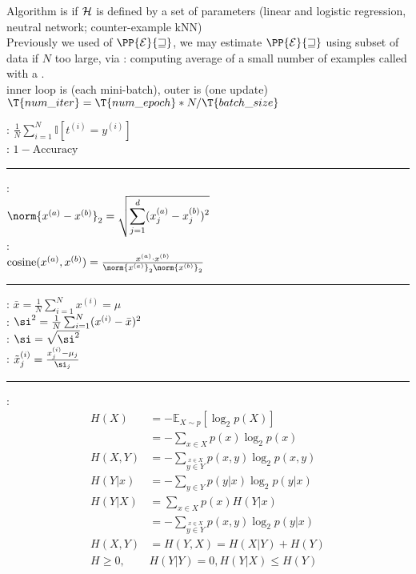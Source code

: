 \documentclass[10pt]{CheatSheet/hw}
\begin{document}
\begin{multicols*}{5}
Algorithm is  if $\cal{H}$ is defined by a set of parameters (linear and logistic regression, neutral network; counter-example kNN)\\
Previously we used  of $\PP{\cal{E}}{w}$, we may estimate $\PP{\cal{E}}{w}$ using subset of data if $N$ too large, via : computing average of a small number of examples called  with a .\\
inner loop is  (each mini-batch), outer is  (one update)\\
$\T{num\_iter}=\T{num\_epoch}* N / \T{batch\_size}$

: $\frac1N\sum_{i=1}^N \mathbb{I}[t^{(i)} = y^{(i)}]$\\
: $1 - \text{Accuracy}$\\
\rule{\linewidth}{0.4pt}
:\\ $\norm{x^{(a)}-x^{(b)}}_2 = \sqrt{\displaystyle\sum_{j=1}^d(x_j^{(a)}-x_j^{(b)})^2}$\\
:\\
$\operatorname{cosine}(x^{(a)}, x^{(b)}) = \frac{x^{(a)}\cdot x^{(b)}}{\norm{x^{(a)}}_2\norm{x^{(b)}}_2}$\\
\rule{\linewidth}{0.4pt}
: $\bar{x}=\frac1N\sum_{i=1}^Nx^{(i)}=\mu$\\
: $\si^2=\frac1N\sum_{i=1}^N(x^{(i)}-\bar{x})^2$\\
: $\si=\sqrt{\si^2}$\\
: $\tilde{x}^{(i)}_j=\frac{x^{(i)}_j-\mu_j}{\si_j}$\\
\rule{\linewidth}{0.4pt}
:
\begin{align*}
    H(X)&=-\mathbb{E}_{X\sim p}[\log_2 p(X)]\\
    &=-\textstyle\sum_{x\in X}p(x)\log_2p(x)\\
    H(X,Y) &= - \textstyle\sum_{\stackrel{x\in X}{y\in Y}}p(x,y)\log_2p(x,y)\\
    H(Y | x) &= - \textstyle\sum_{y\in Y}p(y|x)\log_2p(y|x)\\
    H(Y|X) &= \textstyle\sum_{x\in X}p(x) H(Y|x)\\
    &= - \textstyle\sum_{\stackrel{x\in X}{y\in Y}}p(x,y)\log_2p(y|x)\\
    H(X,Y)&=H(Y,X)=H(X|Y)+H(Y)\\
    H \ge 0, &H(Y|Y)=0, H(Y|X)\le H(Y)\\

\end{align*}
\end{multicols*}
\end{document}
